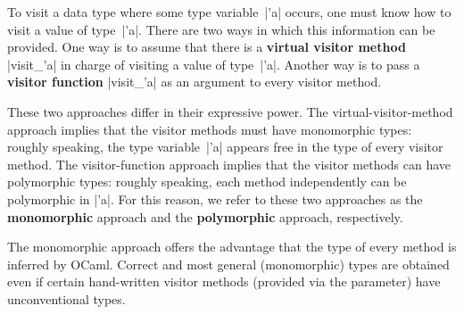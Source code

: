 \documentclass[11pt,a4paper,twoside]{article}
\renewcommand{\emph}[1]{\textbf{#1}}
\begin{document}
To visit a data type where some type variable~\oc|'a| occurs, one must know
how to visit a value of type~\oc|'a|.
%
%
There are two ways in which this information can be provided. One way is to
assume that there is a \emph{virtual visitor method} \oc|visit_'a| in charge
of visiting a value of type~\oc|'a|. Another way is to pass a \emph{visitor
  function} \oc|visit_'a| as an argument to every visitor method.


These two approaches differ in their expressive power. The
virtual-visitor-method approach implies that the visitor methods must have
monomorphic types: roughly speaking, the type variable~\oc|'a|
appears free in the type of every visitor method.
The visitor-function approach implies that the visitor methods can have
polymorphic types: roughly speaking, each method independently
can be polymorphic in \oc|'a|.
For this reason, we refer to these two approaches as the \emph{monomorphic}
approach and the \emph{polymorphic} approach, respectively.

The monomorphic approach offers the advantage that the type of every method is
inferred by OCaml. Correct and most general (monomorphic) types are obtained
even if certain hand-written visitor methods (provided via the \ancestors
parameter) have unconventional types.
%
\end{document}
